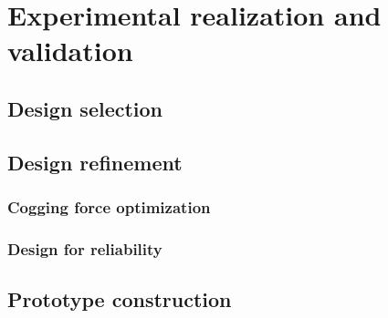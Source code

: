 \chapter{Experimental realization and validation}   \label{Chapter:experiment}
    
\section{Design selection}                          \label{Chapter:experiment/design selection}


\section{Design refinement}                         \label{Chapter:experiment/design refinement}
    \subsection{Cogging force optimization}         \label{Chapter:experiment/design refinement/cogging force optimization}
    \subsection{Design for reliability}             \label{Chapter:experiment/design refinement/design for reliability}


\section{Prototype construction}                    \label{Chapter:experiment/prototype construction}


